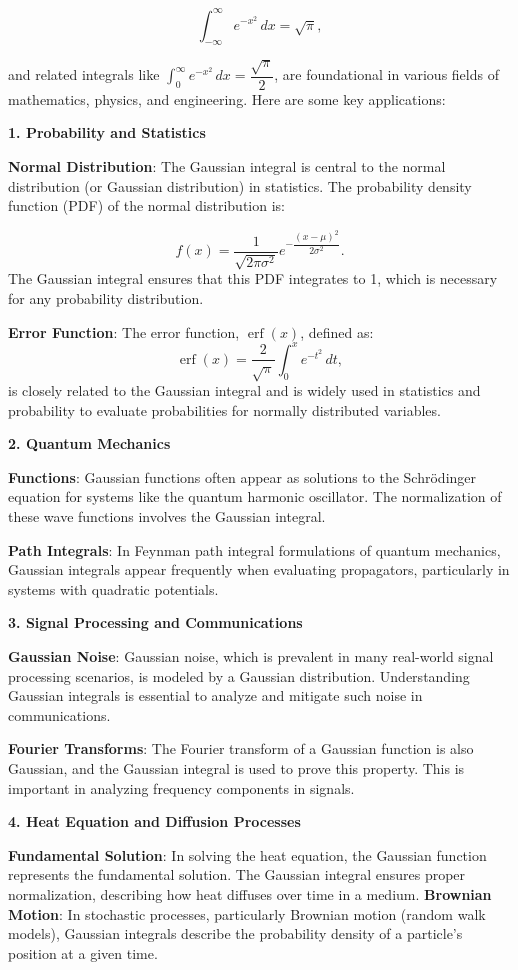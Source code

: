 \documentclass[a4paper,12pt]{book}
\begin{document}
\[
\int_{-\infty}^{\infty} e^{-x^2} \, dx = \sqrt{\pi},
\]

and related integrals like \(\int_{0}^{\infty} e^{-x^2} \, dx = \dfrac{\sqrt{\pi}}{2}\), are foundational in various fields of mathematics, physics, and engineering. Here are some key applications:

\textbf{1. Probability and Statistics}

\textbf{Normal Distribution}: The Gaussian integral is central to the normal distribution (or Gaussian distribution) in statistics. The probability density function (PDF) of the normal distribution is:

\[
f(x) = \dfrac{1}{\sqrt{2 \pi \sigma^2}} e^{-\dfrac{(x - \mu)^2}{2\sigma^2}}.
\]
The Gaussian integral ensures that this PDF integrates to 1, which is necessary for any probability distribution.

\textbf{Error Function}: The error function, \(\operatorname{erf}(x)\), defined as:
\[
\operatorname{erf}(x) = \dfrac{2}{\sqrt{\pi}} \int_0^x e^{-t^2} \, dt,
\]
is closely related to the Gaussian integral and is widely used in statistics and probability to evaluate probabilities for normally distributed variables.

\textbf{2. Quantum Mechanics}

\textbf{Functions}: Gaussian functions often appear as solutions to the Schrödinger equation for systems like the quantum harmonic oscillator. The normalization of these wave functions involves the Gaussian integral.

\textbf{Path Integrals}: In Feynman path integral formulations of quantum mechanics, Gaussian integrals appear frequently when evaluating propagators, particularly in systems with quadratic potentials.

\textbf{3. Signal Processing and Communications}

\textbf{Gaussian Noise}: Gaussian noise, which is prevalent in many real-world signal processing scenarios, is modeled by a Gaussian distribution. Understanding Gaussian integrals is essential to analyze and mitigate such noise in communications.

\textbf{Fourier Transforms}: The Fourier transform of a Gaussian function is also Gaussian, and the Gaussian integral is used to prove this property. This is important in analyzing frequency components in signals.

\textbf{4. Heat Equation and Diffusion Processes}

\textbf{Fundamental Solution}: In solving the heat equation, the Gaussian function represents the fundamental solution. The Gaussian integral ensures proper normalization, describing how heat diffuses over time in a medium.
\textbf{Brownian Motion}: In stochastic processes, particularly Brownian motion (random walk models), Gaussian integrals describe the probability density of a particle's position at a given time.
\end{document}
